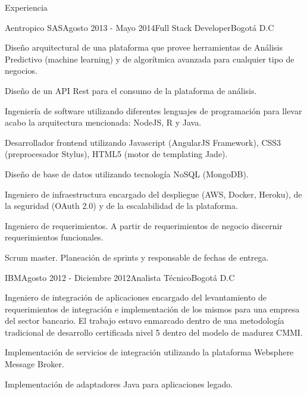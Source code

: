 \documentclass[spanish]{resume} %
\begin{document}
\begin{rSection}{Experiencia}

\begin{rSubsection}{Aentropico SAS}{Agosto 2013 - Mayo 2014}{Full Stack Developer}{Bogot\'a D.C}
\item Dise\~no arquitectural de una plataforma que provee herramientas de An\'alisis Predictivo (machine learning) y de algor\'itmica avanzada para cualquier tipo de negocios.
\item Dise\~no de un API Rest para el consumo de la plataforma de an\'alisis.
\item Ingenier\'ia de software utilizando diferentes lenguajes de programaci\'on para llevar acabo la arquitectura mencionada: NodeJS, R y Java.
\item Desarrollador frontend utilizando Javascript (AngularJS Framework), CSS3 (preprocesador Stylus), HTML5 (motor de templating Jade).
\item Dise\~no de base de datos utilizando tecnolog\'ia NoSQL (MongoDB).
\item Ingeniero de infraestructura encargado del despliegue (AWS, Docker, Heroku), de la seguridad (OAuth 2.0) y de la escalabilidad de la plataforma.
\item Ingeniero de requerimientos. A partir de requerimientos de negocio discernir requerimientos funcionales.
\item Scrum master. Planeaci\'on de sprints y responsable de fechas de entrega.
\end{rSubsection}


\begin{rSubsection}{IBM}{Agosto 2012 - Diciembre 2012}{Analista T\'ecnico}{Bogot\'a D.C}
\item Ingeniero de integraci\'on de aplicaciones encargado del levantamiento de requerimientos de integraci\'on e implementaci\'on de los mismos para una empresa del sector bancario. El trabajo estuvo enmarcado dentro de una metodolog\'ia tradicional de desarrollo certificada nivel 5 dentro del modelo de madurez CMMI.
\item Implementaci\'on de servicios de integraci\'on utilizando la plataforma Websphere Message Broker.
\item Implementaci\'on de adaptadores Java para aplicaciones legado.
\end{rSubsection}



\end{rSection}
\end{document}

